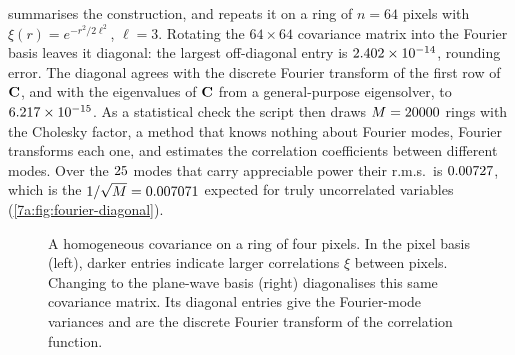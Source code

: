  summarises the construction, and
 repeats it on a ring of $n=64$ pixels
with $\xi(r)=e^{-r^2/2\ell^2}$, $\ell=3$. Rotating the $64\times64$ covariance
matrix into the Fourier basis leaves it diagonal: the largest off-diagonal entry
is $2.402\times10^{-14}$, rounding error. The diagonal agrees with the discrete
Fourier transform of the first row of $\mathbf{C}$, and with the eigenvalues of $\mathbf{C}$
from a general-purpose eigensolver, to $6.217\times10^{-15}$. As a statistical check
the script then draws $M=20000$ rings with the Cholesky factor, a method that
knows nothing about Fourier modes, Fourier transforms each one, and estimates the
correlation coefficients between different modes. Over the $25$ modes that
carry appreciable power their r.m.s.\ is $0.00727$, which is the
$1/\sqrt M=0.007071$ expected for truly uncorrelated variables
(\cref{7a:fig:fourier-diagonal}).

\begin{figure}[htbp]
\centering
{}
\caption{A homogeneous covariance on a ring of four pixels. In the pixel basis (left), darker entries indicate larger correlations $\xi$ between pixels. Changing to the plane-wave basis (right) diagonalises this same covariance matrix. Its diagonal entries give the Fourier-mode variances and are the discrete Fourier transform of the correlation function.}
\label{7a:fig:circulant}
\end{figure}


